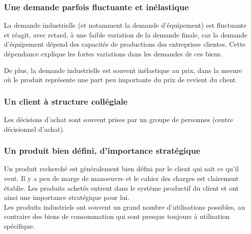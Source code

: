 		\subsubsection{Une demande parfois fluctuante et inélastique}

		La demande industrielle (et notamment la demande d'équipement) est fluctuante et réagit, avec retard, à une faible variation de la demande finale, car la demande d'équipement dépend des capacités de productions des entreprises clientes. Cette dépendance explique les fortes variations dans les demandes de ces biens.

		De plus, la demande industrielle est souvent inélastique au prix, dans la mesure où le produit représente une part peu importante du prix de revient du client.

		\subsubsection{Un client à structure collégiale}

Les décisions d'achat sont souvent prises par un groupe de personnes (centre décisionnel d'achat).



		\subsubsection{Un produit bien défini, d'importance stratégique}

		Un produit recherché est généralement bien défini par le client qui sait ce qu'il veut. Il y a peu de marge de manoeuvre et le cahier des charges est clairement établie. Les produits achetés entrent dans le système productif du client et ont ainsi une importance stratégique pour lui. \\

Les produits industriels ont souvent un grand nombre d'utilisations possibles, au contraire des biens de consommation qui sont presque toujours à utilisation spécifique.

